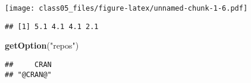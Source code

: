 \documentclass[]{article}
\newenvironment{Shaded}{\begin{snugshade}}{\end{snugshade}}
\newcommand{\KeywordTok}[1]{\textcolor[rgb]{0.13,0.29,0.53}{\textbf{#1}}}
\newcommand{\StringTok}[1]{\textcolor[rgb]{0.31,0.60,0.02}{#1}}
\newcommand{\OperatorTok}[1]{\textcolor[rgb]{0.81,0.36,0.00}{\textbf{#1}}}
\newcommand{\NormalTok}[1]{#1}
\begin{document}
\texttt{[image: class05\_files/figure-latex/unnamed-chunk-1-6.pdf]}

\begin{Shaded}
\end{Shaded}

\begin{verbatim}
## [1] 5.1 4.1 4.1 2.1
\end{verbatim}

\begin{Shaded}
\begin{Highlighting}[]
\KeywordTok{getOption}\NormalTok{(}\StringTok{"repos"}\NormalTok{)}
\end{Highlighting}
\end{Shaded}

\begin{verbatim}
##     CRAN 
## "@CRAN@"
\end{verbatim}
\end{document}
